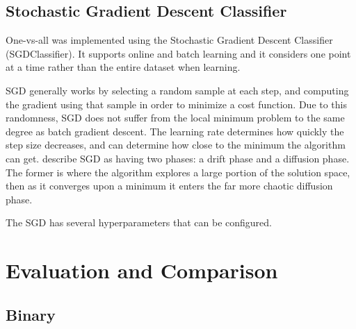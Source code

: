 \documentclass[12pt]{article}
\begin{document}
\subsection{Stochastic Gradient Descent Classifier}

One-vs-all was implemented using the Stochastic Gradient Descent Classifier (SGDClassifier). It supports online and batch learning and it considers one point at a time rather than the entire dataset when learning.

SGD generally works by selecting a random sample at each step, and computing the gradient using that sample in order to minimize a cost function. Due to this randomness, SGD does not suffer from the local minimum problem to the same degree as batch gradient descent. The learning rate determines how quickly the step size decreases, and can determine how close to the minimum the algorithm can get. \cite{sgd} describe SGD as having two phases: a drift phase and a diffusion phase. The former is where the algorithm explores a large portion of the solution space, then as it converges upon a minimum it enters the far more chaotic diffusion phase. 

The SGD has several hyperparameters that can be configured. 

\section{Evaluation and Comparison}

\subsection{Binary}
\end{document}
